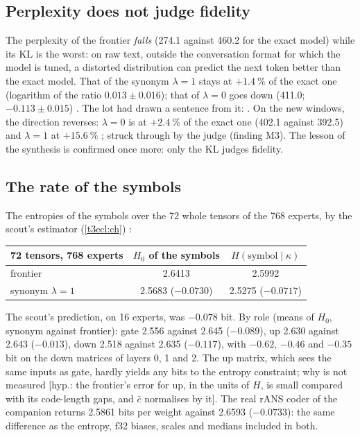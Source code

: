 \subsection{Perplexity does not judge fidelity}\label{t3sno:sec:perplexite}

The perplexity of the frontier \emph{falls} (\num{274.1} against \num{460.2} for the exact model) while its KL is the worst: on raw text, outside the conversation format for which the model is tuned, a distorted distribution can predict the next token better than the exact model. That of the synonym $\lambda = 1$ stays at $+\SI{1.4}{\percent}$ of the exact one (logarithm of the ratio $\num{0.013} \pm \num{0.016}$); that of $\lambda = 0$ goes down (\num{411.0}; $-\num{0.113} \pm \num{0.015}$) \mes. The lot had drawn a sentence from it: . On the new windows, the direction reverses: $\lambda = 0$ is at $+\SI{2.4}{\percent}$ of the exact one (\num{402.1} against \num{392.5}) and $\lambda = 1$ at $+\SI{15.6}{\percent}$ \mes; struck through by the judge (finding M3). The lesson of the synthesis is confirmed once more: only the KL judges fidelity.

\subsection{The rate of the symbols}\label{t3sno:sec:debit}

The entropies of the symbols over the 72 whole tensors of the 768 experts, by the scout's estimator (\cref{t3ecl:ch}) \mes:

\begin{center}\footnotesize
\begin{tabular}{@{}lcc@{}}
\toprule
72 tensors, 768 experts & $H_0$ of the symbols & $H(\text{symbol} \mid \kappa)$ \\
\midrule
frontier & \num{2.6413} & \num{2.5992} \\
synonym $\lambda = 1$ & \num{2.5683} ($-\num{0.0730}$) & \num{2.5275} ($-\num{0.0717}$) \\
\bottomrule
\end{tabular}
\end{center}

The scout's prediction, on 16 experts, was $-\num{0.078}$ bit. By role (means of $H_0$, synonym against frontier): gate \num{2.556} against \num{2.645} ($-\num{0.089}$), up \num{2.630} against \num{2.643} ($-\num{0.013}$), down \num{2.518} against \num{2.635} ($-\num{0.117}$), with $-\num{0.62}$, $-\num{0.46}$ and $-\num{0.35}$ bit on the down matrices of layers 0, 1 and 2. The up matrix, which sees the same inputs as gate, hardly yields any bits to the entropy constraint; why is not measured [hyp.: the frontier's error for up, in the units of $H$, is small compared with its code-length gaps, and $\bar c$ normalises by it]. The real rANS coder of the companion \parencite{duda2013ans} returns \num{2.5861} bits per weight against \num{2.6593} ($-\num{0.0733}$): the same difference as the entropy, f32 biases, scales and medians included in both.

